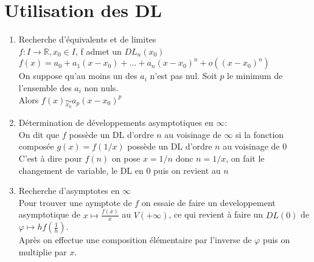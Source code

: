 \documentclass[fleqn]{article}
\theoremstyle{definition} \newtheorem*{defi}{D\'efinition}
\theoremstyle{definition} \newtheorem*{theo}{Th\'eor\`eme}
\theoremstyle{definition} \newtheorem*{prop}{Propri\'et\'e}
\theoremstyle{definition} \newtheorem*{coro}{Corollaire}
\theoremstyle{remark} \newtheorem*{rqs}{Remarques}
\begin{document}
\section{Utilisation des DL}
\begin{enumerate}
	\item Recherche d'\'equivalents et de limites \\
		$f: I \rightarrow \mathbb{R}, x_0 \in I$, f admet un $DL_n(x_0)$ \\
		$f(x) =  a_0 + a_1(x-x_0) + \hdots + a_n(x-x_0)^n + o((x-x_0)^n)$ \\
		On suppose qu'au moins un des $a_i$ n'est pas nul. Soit $p$ le minimum de l'ensemble des $a_i$ non nuls. \\
		Alors $f(x) \underset{x_0}{\sim} a_p(x-x_0)^p$
	\item D\'etermination de d\'eveloppements asymptotiques en $\infty$:\\
		On dit que $f$ poss\`ede un DL d'ordre $n$ au voisinage de $\infty$ si la fonction compos\'ee $g(x)=f(1/x)$ poss\`ede un DL d'ordre $n$ au
		voisinage de $0$ \\
		C'est \`a dire pour $f(n)$ on pose $x=1/n$ donc $n=1/x$, on fait le changement de variable, le DL en $0$ puis on revient au $n$
	\item Recherche d'asymptotes en $\infty$\\
		Pour trouver une aymptote de $f$ on essaie de faire un developpement asymptotique de $x \mapsto \frac{f(x)}{x}$ au $V(+\infty)$,
		ce qui revient \`a faire un $DL(0)$ de $\varphi \mapsto h f(\frac{1}{h})$. \\
		Apr\`es on effectue une composition \'el\'ementaire par l'inverse de $\varphi$ puis on multiplie par $x$.
\end{enumerate}

\end{document}
